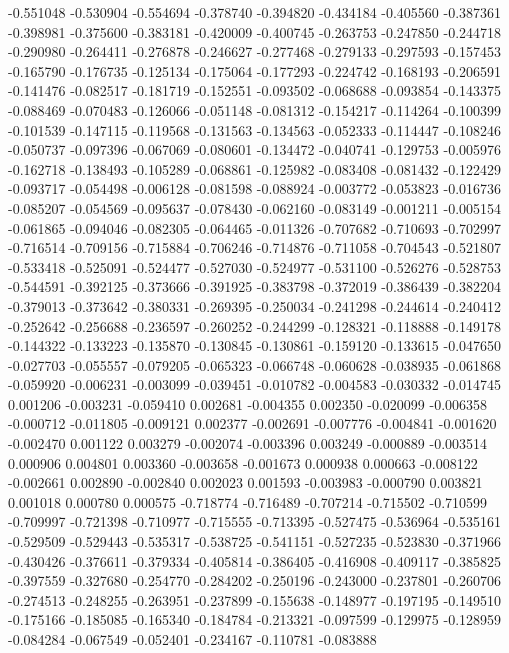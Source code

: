 -0.551048
-0.530904
-0.554694
-0.378740
-0.394820
-0.434184
-0.405560
-0.387361
-0.398981
-0.375600
-0.383181
-0.420009
-0.400745
-0.263753
-0.247850
-0.244718
-0.290980
-0.264411
-0.276878
-0.246627
-0.277468
-0.279133
-0.297593
-0.157453
-0.165790
-0.176735
-0.125134
-0.175064
-0.177293
-0.224742
-0.168193
-0.206591
-0.141476
-0.082517
-0.181719
-0.152551
-0.093502
-0.068688
-0.093854
-0.143375
-0.088469
-0.070483
-0.126066
-0.051148
-0.081312
-0.154217
-0.114264
-0.100399
-0.101539
-0.147115
-0.119568
-0.131563
-0.134563
-0.052333
-0.114447
-0.108246
-0.050737
-0.097396
-0.067069
-0.080601
-0.134472
-0.040741
-0.129753
-0.005976
-0.162718
-0.138493
-0.105289
-0.068861
-0.125982
-0.083408
-0.081432
-0.122429
-0.093717
-0.054498
-0.006128
-0.081598
-0.088924
-0.003772
-0.053823
-0.016736
-0.085207
-0.054569
-0.095637
-0.078430
-0.062160
-0.083149
-0.001211
-0.005154
-0.061865
-0.094046
-0.082305
-0.064465
-0.011326
-0.707682
-0.710693
-0.702997
-0.716514
-0.709156
-0.715884
-0.706246
-0.714876
-0.711058
-0.704543
-0.521807
-0.533418
-0.525091
-0.524477
-0.527030
-0.524977
-0.531100
-0.526276
-0.528753
-0.544591
-0.392125
-0.373666
-0.391925
-0.383798
-0.372019
-0.386439
-0.382204
-0.379013
-0.373642
-0.380331
-0.269395
-0.250034
-0.241298
-0.244614
-0.240412
-0.252642
-0.256688
-0.236597
-0.260252
-0.244299
-0.128321
-0.118888
-0.149178
-0.144322
-0.133223
-0.135870
-0.130845
-0.130861
-0.159120
-0.133615
-0.047650
-0.027703
-0.055557
-0.079205
-0.065323
-0.066748
-0.060628
-0.038935
-0.061868
-0.059920
-0.006231
-0.003099
-0.039451
-0.010782
-0.004583
-0.030332
-0.014745
0.001206
-0.003231
-0.059410
0.002681
-0.004355
0.002350
-0.020099
-0.006358
-0.000712
-0.011805
-0.009121
0.002377
-0.002691
-0.007776
-0.004841
-0.001620
-0.002470
0.001122
0.003279
-0.002074
-0.003396
0.003249
-0.000889
-0.003514
0.000906
0.004801
0.003360
-0.003658
-0.001673
0.000938
0.000663
-0.008122
-0.002661
0.002890
-0.002840
0.002023
0.001593
-0.003983
-0.000790
0.003821
0.001018
0.000780
0.000575
-0.718774
-0.716489
-0.707214
-0.715502
-0.710599
-0.709997
-0.721398
-0.710977
-0.715555
-0.713395
-0.527475
-0.536964
-0.535161
-0.529509
-0.529443
-0.535317
-0.538725
-0.541151
-0.527235
-0.523830
-0.371966
-0.430426
-0.376611
-0.379334
-0.405814
-0.386405
-0.416908
-0.409117
-0.385825
-0.397559
-0.327680
-0.254770
-0.284202
-0.250196
-0.243000
-0.237801
-0.260706
-0.274513
-0.248255
-0.263951
-0.237899
-0.155638
-0.148977
-0.197195
-0.149510
-0.175166
-0.185085
-0.165340
-0.184784
-0.213321
-0.097599
-0.129975
-0.128959
-0.084284
-0.067549
-0.052401
-0.234167
-0.110781
-0.083888
